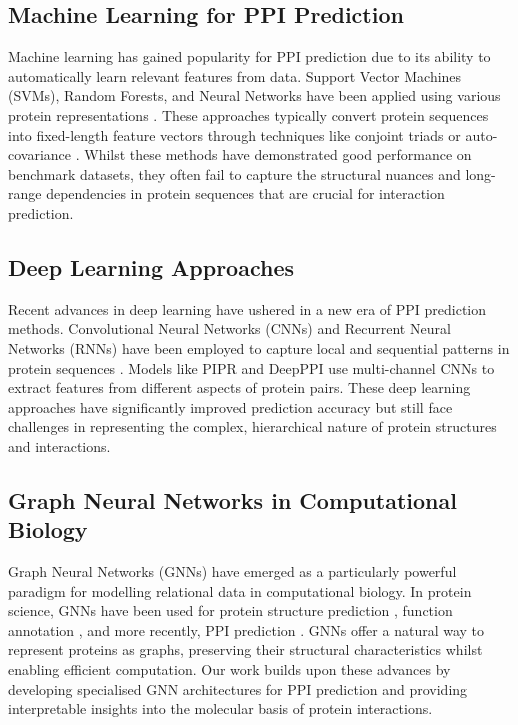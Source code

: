 \documentclass[12pt,a4paper]{article}
\begin{document}
\subsection{Machine Learning for PPI Prediction}

Machine learning has gained popularity for PPI prediction due to its ability to automatically learn relevant features from data. Support Vector Machines (SVMs), Random Forests, and Neural Networks have been applied using various protein representations \cite{you2013prediction}. These approaches typically convert protein sequences into fixed-length feature vectors through techniques like conjoint triads \cite{shen2007predicting} or auto-covariance \cite{guo2008using}. Whilst these methods have demonstrated good performance on benchmark datasets, they often fail to capture the structural nuances and long-range dependencies in protein sequences that are crucial for interaction prediction.

\subsection{Deep Learning Approaches}

Recent advances in deep learning have ushered in a new era of PPI prediction methods. Convolutional Neural Networks (CNNs) and Recurrent Neural Networks (RNNs) have been employed to capture local and sequential patterns in protein sequences \cite{sun2017sequence}. Models like PIPR \cite{chen2019multifaceted} and DeepPPI \cite{du2017deepppi} use multi-channel CNNs to extract features from different aspects of protein pairs. These deep learning approaches have significantly improved prediction accuracy but still face challenges in representing the complex, hierarchical nature of protein structures and interactions.

\subsection{Graph Neural Networks in Computational Biology}

Graph Neural Networks (GNNs) have emerged as a particularly powerful paradigm for modelling relational data in computational biology. In protein science, GNNs have been used for protein structure prediction \cite{ingraham2019generative}, function annotation \cite{gligorijevic2021structure}, and more recently, PPI prediction \cite{fout2017protein}. GNNs offer a natural way to represent proteins as graphs, preserving their structural characteristics whilst enabling efficient computation. Our work builds upon these advances by developing specialised GNN architectures for PPI prediction and providing interpretable insights into the molecular basis of protein interactions.
\end{document}
